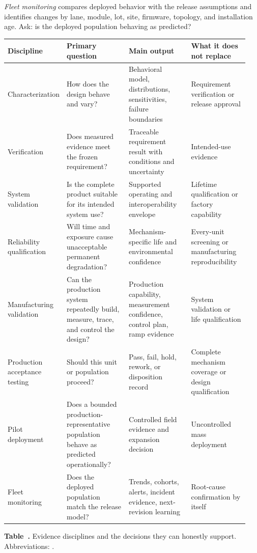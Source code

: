\emph{Fleet monitoring} compares deployed behavior with the release assumptions
and identifies changes by lane, module, lot, site, firmware, topology, and
installation age. Ask: is the deployed population behaving as predicted?

\begin{table}[ht]
\label{tab:validation-jobs}%
\centering
\setlength{\tabcolsep}{2.5pt}%
\footnotesize
\renewcommand{\arraystretch}{1.12}%
\begin{tabular}{@{}p{0.18\linewidth}p{0.26\linewidth}p{0.26\linewidth}p{0.24\linewidth}@{}}
\toprule
Discipline & Primary question & Main output & What it does not replace \\
\midrule
Characterization & How does the design behave and vary? & Behavioral model,
distributions, sensitivities, failure boundaries & Requirement verification or
release approval \\
\addlinespace[0.5em]
Verification & Does measured evidence meet the frozen requirement? & Traceable
requirement result with conditions and uncertainty & Intended-use evidence \\
\addlinespace[0.5em]
System validation & Is the complete product suitable for its intended system
use? & Supported operating and interoperability envelope & Lifetime
qualification or factory capability \\
\addlinespace[0.5em]
Reliability qualification & Will time and exposure cause unacceptable permanent
degradation? & Mechanism-specific life and environmental confidence & Every-unit
screening or manufacturing reproducibility \\
\addlinespace[0.5em]
Manufacturing validation & Can the production system repeatedly build, measure,
trace, and control the design? & Production capability, measurement confidence,
control plan, ramp evidence & System validation or life qualification \\
\addlinespace[0.5em]
Production acceptance testing & Should this unit or population proceed? & Pass,
fail, hold, rework, or disposition record & Complete mechanism coverage or
design qualification \\
\addlinespace[0.5em]
Pilot deployment & Does a bounded production-representative population behave as
predicted operationally? & Controlled field evidence and expansion decision &
Uncontrolled mass deployment \\
\addlinespace[0.5em]
Fleet monitoring & Does the deployed population match the release model? &
Trends, cohorts, alerts, incident evidence, next-revision learning & Root-cause
confirmation by itself \\
\bottomrule
\end{tabular}
\par\medskip
{\raggedright\footnotesize\textbf{Table~\thetable.} Evidence disciplines and
the decisions they can honestly support. Abbreviations:
.\par}
\end{table}

